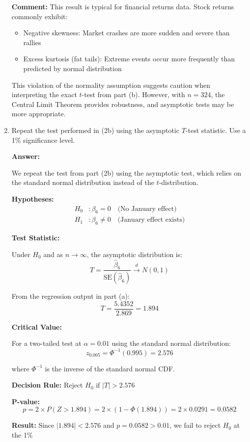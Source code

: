 \documentclass[12pt,a4paper]{article}
\begin{document}
\begin{enumerate}[label=(\alph*)]
\textbf{Comment:} This result is typical for financial returns data. Stock returns commonly exhibit:
\begin{itemize}
\item Negative skewness: Market crashes are more sudden and severe than rallies
\item Excess kurtosis (fat tails): Extreme events occur more frequently than predicted by normal distribution
\end{itemize}

This violation of the normality assumption suggests caution when interpreting the exact $t$-test from part (b). However, with $n=324$, the Central Limit Theorem provides robustness, and asymptotic tests may be more appropriate.
  
  \item Repeat the test performed in (2b) using the asymptotic $T$-test statistic. Use a 1\% significance level.
  
  \textbf{Answer:} 

We repeat the test from part (2b) using the asymptotic test, 
which relies on the standard normal distribution instead of 
the $t$-distribution.

\textbf{Hypotheses:}
\begin{align*}
H_0&: \beta_6 = 0 \quad \text{(No January effect)} \\
H_1&: \beta_6 \neq 0 \quad \text{(January effect exists)}
\end{align*}

\textbf{Test Statistic:}

Under $H_0$ and as $n \to \infty$, the asymptotic distribution is:
$$T = \frac{\hat{\beta}_6}{\text{SE}(\hat{\beta}_6)} 
\xrightarrow{d} N(0,1)$$

From the regression output in part (a):
$$T = \frac{5.4352}{2.869} = 1.894$$

\textbf{Critical Value:}

For a two-tailed test at $\alpha = 0.01$ using the standard 
normal distribution:
$$z_{0.005} = \Phi^{-1}(0.995) = 2.576$$

where $\Phi^{-1}$ is the inverse of the standard normal CDF.

\textbf{Decision Rule:} Reject $H_0$ if $|T| > 2.576$

\textbf{P-value:} 
$$p = 2 \times P(Z > 1.894) = 2 \times (1 - \Phi(1.894)) 
= 2 \times 0.0291 = 0.0582$$

\textbf{Result:} Since $|1.894| < 2.576$ and 
$p = 0.0582 > 0.01$, we fail to reject $H_0$ at the 1\% 
  

\end{enumerate}
\end{document}
